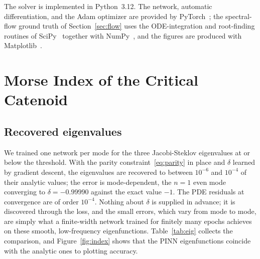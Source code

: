 \documentclass[11pt]{article}
\theoremstyle{definition}
\theoremstyle{plain}
\begin{document}
The solver is implemented in Python~3.12. The network, automatic differentiation, and the Adam optimizer are provided by PyTorch~\cite{pytorch01}; the spectral-flow ground truth of Section~\ref{sec:flow} uses the ODE-integration and root-finding routines of SciPy~\cite{scipy01} together with NumPy~\cite{numpy01}, and the figures are produced with Matplotlib~\cite{matplotlib01}.

\section{Morse Index of the Critical Catenoid}\label{sec:index}

\subsection{Recovered eigenvalues}

We trained one network per mode for the three Jacobi-Steklov eigenvalues at or below the threshold. With the parity constraint~\eqref{eq:parity} in place and $\delta$ learned by gradient descent, the eigenvalues are recovered to between $10^{-6}$ and $10^{-4}$ of their analytic values; the error is mode-dependent, the $n=1$ even mode converging to $\delta = -0.99990$ against the exact value $-1$. The PDE residuals at convergence are of order $10^{-4}$. Nothing about $\delta$ is supplied in advance; it is discovered through the loss, and the small errors, which vary from mode to mode, are simply what a finite-width network trained for finitely many epochs achieves on these smooth, low-frequency eigenfunctions. Table~\ref{tab:eig} collects the comparison, and Figure~\ref{fig:index} shows that the PINN eigenfunctions coincide with the analytic ones to plotting accuracy.
\end{document}
